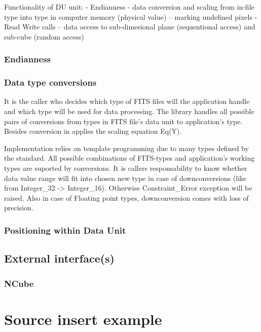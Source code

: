 \documentclass[a4paper,10pt]{article}
\begin{document}
Functionality of DU unit: 
- Endianness
- data conversion and scaling from in-file type into type in computer memory (physical value)
-- marking undefined pixels
- Read Write calls
-- data access to sub-dimesional plane (sequentional access) and sub-cube (random access)


\subsubsection{Endianness}

\subsubsection{Data type conversions}

It is the caller who decides which type of FITS files will the application handle and
which type will be used for data processing. The library handles all possible pairs of
conversions from types in FITS file's data unit to application's type.
Besides conversion in applies the scaling equation Eq(Y).

Implementation relies on template programming due to many types defined by the standard. 
All possible combinations of FITS-types and application's working types are suported
by conversions. It is callers responsability to know whether data value range will fit
into chosen new type in case of downconversions (like from Integer\_32 -> Integer\_16).
Otherwise Constraint\_Error exception will be raised.
Also in case of Floating point types, downconversion comes with loss of precision.


\subsubsection{Positioning within Data Unit}




\subsection{External interface(s)}
\subsubsection{NCube}







\section{Source insert example}
\end{document}
